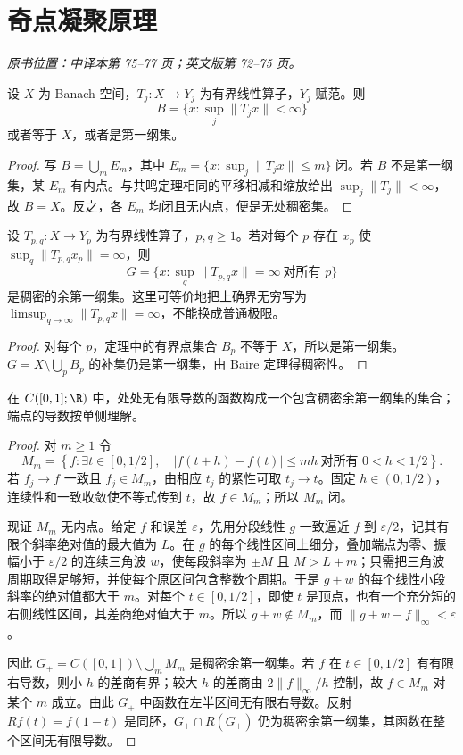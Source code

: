 \section{奇点凝聚原理}\label{sec:yosida-02-04}
\noindent\textit{原书位置：中译本第 75--77 页；英文版第 72--75 页。}

\begin{theorem}[有界点集合的二择性]\label{thm:y2-bounded-points}
设 $X$ 为 Banach 空间，$T_j:X\to Y_j$ 为有界线性算子，$Y_j$ 赋范。则
\[
 B=\{x:\sup_j\|T_jx\|<\infty\}
\]
或者等于 $X$，或者是第一纲集。
\end{theorem}
\begin{proof}
写 $B=\bigcup_m E_m$，其中 $E_m=\{x:\sup_j\|T_jx\|\le m\}$ 闭。若 $B$ 不是第一纲集，某 $E_m$ 有内点。与共鸣定理相同的平移相减和缩放给出 $\sup_j\|T_j\|<\infty$，故 $B=X$。反之，各 $E_m$ 均闭且无内点，便是无处稠密集。
\end{proof}

\begin{corollary}\label{cor:y2-condensation}
设 $T_{p,q}:X\to Y_p$ 为有界线性算子，$p,q\ge1$。若对每个 $p$ 存在 $x_p$ 使 $\sup_q\|T_{p,q}x_p\|=\infty$，则
\[
 G=\{x:\sup_q\|T_{p,q}x\|=\infty\ \text{对所有 }p\}
\]
是稠密的余第一纲集。这里可等价地把上确界无穷写为 $\limsup_{q\to\infty}\|T_{p,q}x\|=\infty$，不能换成普通极限。
\end{corollary}
\begin{proof}
对每个 $p$，定理中的有界点集合 $B_p$ 不等于 $X$，所以是第一纲集。$G=X\setminus\bigcup_pB_p$ 的补集仍是第一纲集，由 Baire 定理得稠密性。
\end{proof}

\begin{theorem}\label{thm:y2-nowhere-differentiable}
在 $C([0,1];\R)$ 中，处处无有限导数的函数构成一个包含稠密余第一纲集的集合；端点的导数按单侧理解。
\end{theorem}
\begin{proof}
对 $m\ge1$ 令
\[
 M_m=\left\{f:\exists t\in[0,1/2],\quad
 |f(t+h)-f(t)|\le mh\ \text{对所有 }0<h<1/2\right\}.
\]
若 $f_j\to f$ 一致且 $f_j\in M_m$，由相应 $t_j$ 的紧性可取 $t_j\to t$。固定 $h\in(0,1/2)$，连续性和一致收敛使不等式传到 $t$，故 $f\in M_m$；所以 $M_m$ 闭。

现证 $M_m$ 无内点。给定 $f$ 和误差 $\varepsilon$，先用分段线性 $g$ 一致逼近 $f$ 到 $\varepsilon/2$，记其有限个斜率绝对值的最大值为 $L$。在 $g$ 的每个线性区间上细分，叠加端点为零、振幅小于 $\varepsilon/2$ 的连续三角波 $w$，使每段斜率为 $\pm M$ 且 $M>L+m$；只需把三角波周期取得足够短，并使每个原区间包含整数个周期。于是 $g+w$ 的每个线性小段斜率的绝对值都大于 $m$。对每个 $t\in[0,1/2]$，即使 $t$ 是顶点，也有一个充分短的右侧线性区间，其差商绝对值大于 $m$。所以 $g+w\notin M_m$，而 $\|g+w-f\|_\infty<\varepsilon$。

因此 $G_+=C([0,1])\setminus\bigcup_mM_m$ 是稠密余第一纲集。若 $f$ 在 $t\in[0,1/2]$ 有有限右导数，则小 $h$ 的差商有界；较大 $h$ 的差商由 $2\|f\|_\infty/h$ 控制，故 $f\in M_m$ 对某个 $m$ 成立。由此 $G_+$ 中函数在左半区间无有限右导数。反射 $Rf(t)=f(1-t)$ 是同胚，$G_+\cap R(G_+)$ 仍为稠密余第一纲集，其函数在整个区间无有限导数。
\end{proof}

